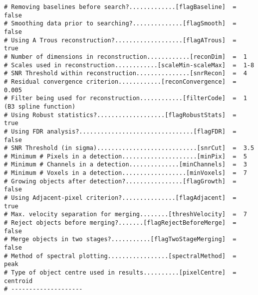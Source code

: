 {\begin{verbatim}
# Removing baselines before search?.............[flagBaseline]  =  false
# Smoothing data prior to searching?..............[flagSmooth]  =  false
# Using A Trous reconstruction?...................[flagATrous]  =  true
# Number of dimensions in reconstruction............[reconDim]  =  1
# Scales used in reconstruction............[scaleMin-scaleMax]  =  1-8
# SNR Threshold within reconstruction...............[snrRecon]  =  4
# Residual convergence criterion............[reconConvergence]  =  0.005
# Filter being used for reconstruction............[filterCode]  =  1 (B3 spline function)
# Using Robust statistics?...................[flagRobustStats]  =  true
# Using FDR analysis?................................[flagFDR]  =  false
# SNR Threshold (in sigma)............................[snrCut]  =  3.5
# Minimum # Pixels in a detection.....................[minPix]  =  5
# Minimum # Channels in a detection..............[minChannels]  =  3
# Minimum # Voxels in a detection..................[minVoxels]  =  7
# Growing objects after detection?................[flagGrowth]  =  false
# Using Adjacent-pixel criterion?...............[flagAdjacent]  =  true
# Max. velocity separation for merging........[threshVelocity]  =  7
# Reject objects before merging?.......[flagRejectBeforeMerge]  =  false
# Merge objects in two stages?...........[flagTwoStageMerging]  =  false
# Method of spectral plotting.................[spectralMethod]  =  peak
# Type of object centre used in results..........[pixelCentre]  =  centroid
# --------------------
\end{verbatim}
}

